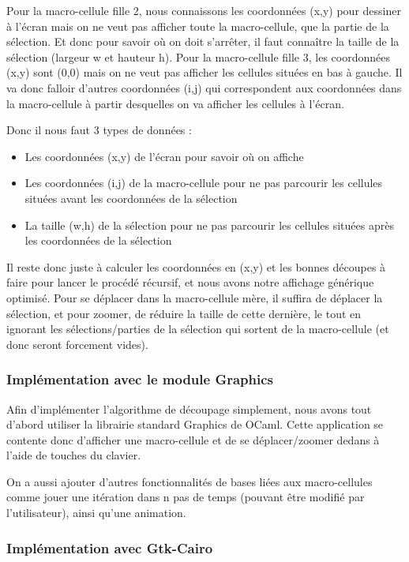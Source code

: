 \documentclass[a4paper,12pt]{report}
\begin{document}
Pour la macro-cellule fille 2, nous connaissons les coordonnées (x,y)
pour dessiner à l'écran mais on ne veut pas afficher toute la
macro-cellule, que la partie de la sélection. Et donc pour savoir où
on doit s'arrêter, il faut connaître la taille de la sélection
(largeur w et hauteur h).
Pour la macro-cellule fille 3, les coordonnées (x,y) sont (0,0) mais
on ne veut pas afficher les cellules situées en bas à gauche. Il va
donc falloir d'autres coordonnées (i,j) qui correspondent aux
coordonnées dans la macro-cellule à partir desquelles on va afficher
les cellules à l'écran.

\medskip

Donc il nous faut 3 types de données :
\begin{itemize}
\item Les coordonnées (x,y) de l'écran pour savoir où on affiche
\item Les coordonnées (i,j) de la macro-cellule pour ne pas parcourir
  les cellules situées avant les coordonnées de la sélection
\item La taille (w,h) de la sélection pour ne pas parcourir les
  cellules situées après les coordonnées de la sélection
\end{itemize}

Il reste donc juste à calculer les coordonnées en (x,y) et les bonnes
découpes à faire pour lancer le procédé récursif, et nous avons notre
affichage générique optimisé. Pour se déplacer dans la macro-cellule
mère, il suffira de déplacer la sélection, et pour zoomer, de réduire
la taille de cette dernière, le tout en ignorant les
sélections/parties de la sélection qui sortent de la macro-cellule (et
donc seront forcement vides).

\subsubsection{Implémentation avec le module Graphics}

Afin d'implémenter l'algorithme de découpage simplement, nous avons
tout d'abord utiliser la librairie standard Graphics de OCaml.
Cette application se contente donc d'afficher une macro-cellule et de
se déplacer/zoomer dedans à l'aide de touches du clavier.

On a aussi ajouter d'autres fonctionnalités de bases liées aux
macro-cellules comme jouer une itération dans n pas de temps (pouvant
être modifié par l'utilisateur), ainsi qu'une animation.

\subsubsection{Implémentation avec Gtk-Cairo}
\end{document}
